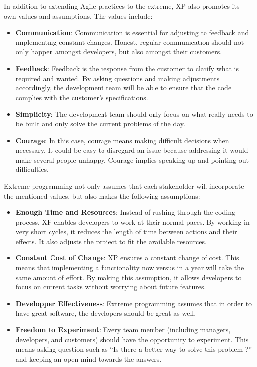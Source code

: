 \documentclass[]{article}
\begin{document}
In addition to extending Agile practices to the extreme, XP also
promotes its own values and assumptions. The values include:

\begin{itemize}
\itemsep1pt\parskip0pt
\item
  \textbf{Communication}: Communication is essential for adjusting to
  feedback and implementing constant changes. Honest, regular
  communication should not only happen amongst developers, but also
  amongst their customers.
\item
  \textbf{Feedback}: Feedback is the response from the customer to
  clarify what is required and wanted. By asking questions and making
  adjustments accordingly, the development team will be able to ensure
  that the code complies with the customer's specifications.
\item
  \textbf{Simplicity}: The development team should only focus on what
  really needs to be built and only solve the current problems of the
  day.
\item
  \textbf{Courage}: In this case, courage means making difficult
  decisions when necessary. It could be easy to disregard an issue
  because addressing it would make several people unhappy. Courage
  implies speaking up and pointing out difficulties.
\end{itemize}

Extreme programming not only assumes that each stakeholder will
incorporate the mentioned values, but also makes the following
assumptions:

\begin{itemize}
\itemsep1pt\parskip0pt
\item
  \textbf{Enough Time and Resources}: Instead of rushing through the
  coding process, XP enables developers to work at their normal paces.
  By working in very short cycles, it reduces the length of time between
  actions and their effects. It also adjusts the project to fit the
  available resources.
\item
  \textbf{Constant Cost of Change}: XP ensures a constant change of
  cost. This means that implementing a functionality now versus in a
  year will take the same amount of effort. By making this assumption,
  it allows developers to focus on current tasks without worrying about
  future features.
\item
  \textbf{Developper Effectiveness}: Extreme programming assumes that in
  order to have great software, the developers should be great as well.
\item
  \textbf{Freedom to Experiment}: Every team member (including managers,
  developers, and customers) should have the opportunity to experiment.
  This means asking question such as ``Is there a better way to solve
  this problem ?'' and keeping an open mind towards the answers.
\end{itemize}
\end{document}
